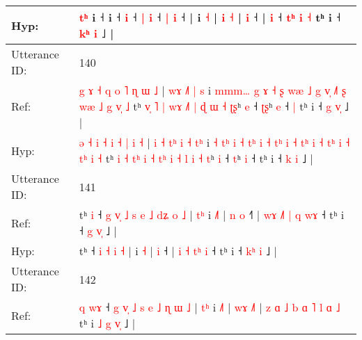 \documentclass[10pt]{article}
\DeclareRobustCommand{\hl}[1]{{\textcolor{red}{#1}}}
\begin{document}
\begin{longtable}{ll}
 \\
Hyp: & \hl{}\hl{}\hl{}\hl{}\hl{}\hl{}\hl{}\hl{t}\hl{ʰ} i ˧\hl{}\hl{} i ˧\hl{}\hl{}\hl{}\hl{} \hl{i} ˧ \hl{|} \hl{i} ˧ \hl{|} \hl{i} ˧ |\hl{}\hl{}\hl{}\hl{}\hl{}\hl{} i \hl{˧} | \hl{}\hl{i} \hl{}\hl{˧} |\hl{}\hl{} \hl{i} ˧\hl{}\hl{}\hl{}\hl{}\hl{}\hl{} |\hl{}\hl{} \hl{i} ˧ \hl{}\hl{t}\hl{ʰ} \hl{i} \hl{˧} tʰ i ˧ \hl{k}\hl{ʰ}\hl{ }\hl{i} ˩ |
 \\
\midrule
Utterance ID: & 140 \\
Ref: & \hl{g} \hl{ɤ} \hl{˧} \hl{q} \hl{o} \hl{˥} \hl{ɳ} \hl{ɯ} \hl{˩} | \hl{}\hl{w}\hl{ɤ} \hl{}\hl{}\hl{˩}\hl{˥} \hl{|} \hl{}\hl{s} i\hl{}\hl{} \hl{m}\hl{m}\hl{m}\hl{…} \hl{g} \hl{}\hl{ɤ} \hl{˧} \hl{ʂ} \hl{w}\hl{æ} \hl{˩} \hl{g} \hl{v}\hl{̩} \hl{˩}\hl{˥} \hl{ʂ} \hl{w}\hl{æ} \hl{˩} \hl{g} \hl{}\hl{}\hl{v}\hl{̩} \hl{˩} tʰ \hl{v}\hl{̩} \hl{˥} \hl{}\hl{|} \hl{}\hl{w}\hl{ɤ} \hl{˩}\hl{˥} \hl{|} \hl{ɖ} \hl{ɯ} \hl{˧} \hl{}\hl{ʈ}\hl{ʂ}ʰ \hl{e} ˧ \hl{ʈ}\hl{ʂ}ʰ \hl{e} ˧\hl{ }\hl{|} tʰ i ˧ \hl{g} \hl{v}\hl{̩} ˩ |
 \\
Hyp: & \hl{ə} \hl{˧} \hl{i} \hl{˧} \hl{i} \hl{˧} \hl{|} \hl{i} \hl{˧} | \hl{i}\hl{ }\hl{˧} \hl{t}\hl{ʰ}\hl{ }\hl{i} \hl{˧} \hl{t}\hl{ʰ} i\hl{ }\hl{˧} \hl{t}\hl{ʰ}\hl{ }\hl{i} \hl{˧} \hl{t}\hl{ʰ} \hl{i} \hl{˧} \hl{t}\hl{ʰ} \hl{i} \hl{˧} \hl{t}\hl{ʰ} \hl{}\hl{i} \hl{˧} \hl{t}\hl{ʰ} \hl{i} \hl{˧} \hl{t}\hl{ʰ}\hl{ }\hl{i} \hl{˧} tʰ \hl{}\hl{i} \hl{˧} \hl{t}\hl{ʰ} \hl{i}\hl{ }\hl{˧} \hl{t}\hl{ʰ} \hl{i} \hl{˧} \hl{l} \hl{i} \hl{˧}\hl{ }\hl{t}ʰ \hl{i} ˧ \hl{}\hl{t}ʰ \hl{i} ˧\hl{}\hl{} tʰ i ˧ \hl{k} \hl{}\hl{i} ˩ |
 \\
\midrule
Utterance ID: & 141 \\
Ref: & tʰ\hl{ }\hl{i} ˧\hl{ }\hl{g}\hl{ }\hl{v}\hl{̩}\hl{ }\hl{˩}\hl{ }\hl{s}\hl{ }\hl{e} \hl{˩} \hl{d}\hl{ʑ} \hl{o} \hl{˩} |\hl{ }\hl{t}\hl{ʰ} i \hl{˩}\hl{˥} |\hl{ }\hl{n} \hl{o} ˧\hl{˥} | \hl{w}\hl{ɤ} \hl{˩}\hl{˥} \hl{|}\hl{ }\hl{q} \hl{w}\hl{ɤ} ˧ tʰ i ˧ \hl{g}\hl{ }\hl{v}\hl{̩} ˩ |
 \\
Hyp: & tʰ\hl{}\hl{} ˧\hl{}\hl{}\hl{}\hl{}\hl{}\hl{}\hl{}\hl{}\hl{}\hl{}\hl{} \hl{i} \hl{}\hl{˧} \hl{i} \hl{˧} |\hl{}\hl{}\hl{} i \hl{}\hl{˧} |\hl{}\hl{} \hl{i} ˧\hl{} | \hl{}\hl{i} \hl{}\hl{˧} \hl{}\hl{t}\hl{ʰ} \hl{}\hl{i} ˧ tʰ i ˧ \hl{k}\hl{ʰ}\hl{ }\hl{i} ˩ |
 \\
\midrule
Utterance ID: & 142 \\
Ref: & \hl{q}\hl{ }\hl{w}\hl{ɤ} ˧\hl{ }\hl{g}\hl{ }\hl{v}\hl{̩}\hl{ }\hl{˩}\hl{ }\hl{s}\hl{ }\hl{e} \hl{˩} \hl{ɳ} \hl{ɯ} \hl{˩} |\hl{ }\hl{t}\hl{ʰ} i \hl{˩}\hl{˥} | \hl{w}\hl{ɤ} \hl{˩}\hl{˥} | \hl{z} \hl{ɑ} \hl{˩} \hl{b} \hl{ɑ} \hl{˥}\hl{ }\hl{l} \hl{ɑ} \hl{˩} tʰ i \hl{˩} \hl{g} \hl{v}\hl{̩} ˩ |

\end{longtable}
\end{document}
